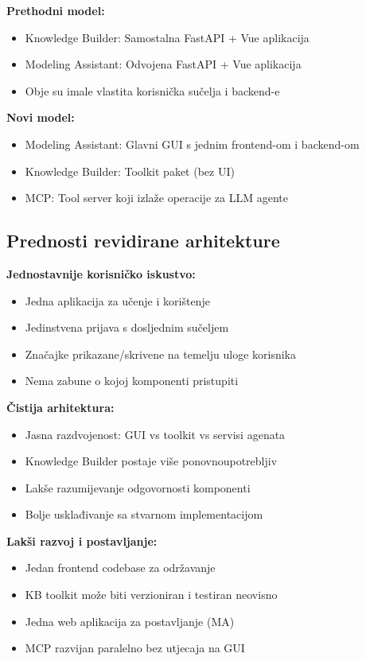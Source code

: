 \documentclass[12pt,a4paper]{article}
\begin{document}
\textbf{Prethodni model:}
\begin{itemize}[noitemsep]
    \item Knowledge Builder: Samostalna FastAPI + Vue aplikacija
    \item Modeling Assistant: Odvojena FastAPI + Vue aplikacija
    \item Obje su imale vlastita korisnička sučelja i backend-e
\end{itemize}

\textbf{Novi model:}
\begin{itemize}[noitemsep]
    \item Modeling Assistant: Glavni GUI s jednim frontend-om i backend-om
    \item Knowledge Builder: Toolkit paket (bez UI)
    \item MCP: Tool server koji izlaže operacije za LLM agente
\end{itemize}

\subsection{Prednosti revidirane arhitekture}

\textbf{Jednostavnije korisničko iskustvo:}
\begin{itemize}[noitemsep]
    \item Jedna aplikacija za učenje i korištenje
    \item Jedinstvena prijava s dosljednim sučeljem
    \item Značajke prikazane/skrivene na temelju uloge korisnika
    \item Nema zabune o kojoj komponenti pristupiti
\end{itemize}

\textbf{Čistija arhitektura:}
\begin{itemize}[noitemsep]
    \item Jasna razdvojenost: GUI vs toolkit vs servisi agenata
    \item Knowledge Builder postaje više ponovnoupotrebljiv
    \item Lakše razumijevanje odgovornosti komponenti
    \item Bolje usklađivanje sa stvarnom implementacijom
\end{itemize}

\textbf{Lakši razvoj i postavljanje:}
\begin{itemize}[noitemsep]
    \item Jedan frontend codebase za održavanje
    \item KB toolkit može biti verzioniran i testiran neovisno
    \item Jedna web aplikacija za postavljanje (MA)
    \item MCP razvijan paralelno bez utjecaja na GUI
\end{itemize}
\end{document}
